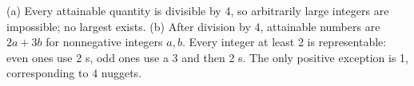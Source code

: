 (a) Every attainable quantity is divisible by 4, so arbitrarily large integers are impossible; no largest exists. (b) After division by 4, attainable numbers are $2a+3b$ for nonnegative integers $a,b$. Every integer at least 2 is representable: even ones use 2 s, odd ones use a 3 and then 2 s. The only positive exception is 1, corresponding to $\boxed4$ nuggets.

